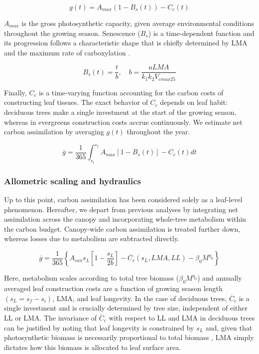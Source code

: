 \begin{equation}
    g(t) = A_{max}(1 - B_s(t)) - C_{c}(t)
\end{equation}

$A_{max}$ is the gross photosynthetic capacity, given average environmental conditions throughout the growing season. Senescence ($B_{s}$) is a time-dependent function and its progression follows a characteristic shape that is chiefly determined by LMA and the maximum rate of carboxylation \cite{xu_variations_2017}. 

\begin{equation}
    B_{s}(t) = \dfrac{t}{b}, \quad b = \dfrac{u LMA}{k_{1} k_{2} V_{cmax25}}
\end{equation}

Finally, $C_{c}$ is a time-varying function accounting for the carbon costs of constructing leaf tissues. The exact behavior of $C_{c}$ depends on leaf habit: deciduous trees make a single investment at the start of the growing season, whereas in evergreens construction costs accrue continuously. We estimate net carbon assimilation by averaging $g(t)$ throughout the year.

\begin{equation}
    \overline{g} =\dfrac{1}{365} \int_{s_{i}}^{s_{f}} A_{max}\left[1 - B_s(t)\right] - C_{c}(t) dt
\end{equation}

\subsubsection{Allometric scaling and hydraulics}

 Up to this point, carbon assimilation has been considered solely as a leaf-level phenomenon. Hereafter, we depart from previous analyses by integrating net assimilation across the canopy and incorporating whole-tree metabolism within the carbon budget. Canopy-wide carbon assimilation is treated further down, whereas losses due to metabolism are subtracted directly.

 \begin{equation}
    \overline{g} =\dfrac{1}{365} \left\{ A_{can}s_L\left[ 1 - \dfrac{s_L}{2b} \right] - \overline{C}_c\left(s_L, LMA, LL \right) - \beta_0 M^{\eta_0} \right\}
    \label{eq:net_g}
\end{equation}

Here, metabolism scales according to total tree biomass ($\beta_0M^{\eta_0}$) and annually averaged leaf construction costs are a function of growing season length $(s_L = s_f - s_i)$, LMA, and leaf longevity. In the case of deciduous trees, $\overline{C}_c$ is a single investment and is crucially determined by tree size, independent of either LL or LMA. The invariance of $\overline{C}_c$ with respect to LL and LMA in deciduous trees can be justified by noting that leaf longevity is constrained by $s_L$ and, given that photosynthetic biomass is necessarily proportional to total biomass \cite{niklas_invariant_2001}, LMA simply dictates how this biomass is allocated to leaf surface area.

